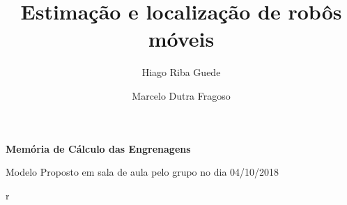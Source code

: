\documentclass[11pt,a4paper]{book}
\title{Estimação e localização de robôs móveis}
\author{Hiago Riba Guede}
\date{Marcelo Dutra Fragoso}
\begin{document}
\begin{center}
\Large{\textbf{Memória de Cálculo das Engrenagens}}

Modelo Proposto em sala de aula pelo grupo no dia 04/10/2018
\end{center}

r
\end{document}
